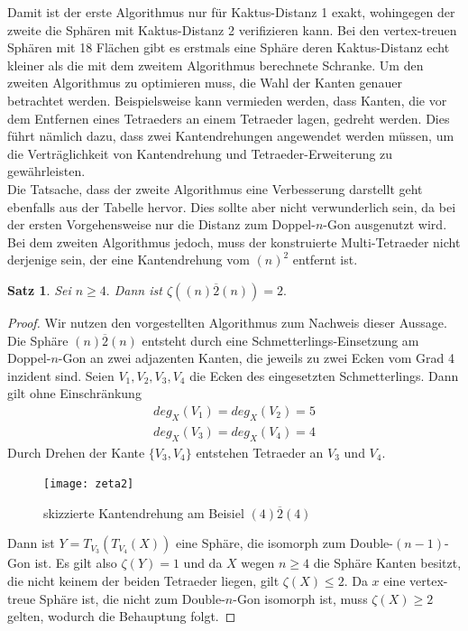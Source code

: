 \documentclass[12pt,titlepage,twoside,cleardoublepage]{article}
\theoremstyle{nummermitklammern}
\newtheorem{satz}[temp]{Satz}
\newtheorem{satz}[zahl]{Satz}
\numberwithin{equation}{section}
\begin{document}
Damit ist der erste Algorithmus nur für Kaktus-Distanz 1 exakt, wohingegen der zweite die Sphären mit Kaktus-Distanz 2 verifizieren kann. Bei den vertex-treuen Sphären mit 18 Flächen gibt es erstmals eine Sphäre deren Kaktus-Distanz echt kleiner als die mit dem zweitem Algorithmus berechnete Schranke.
Um den zweiten Algorithmus zu optimieren muss, die Wahl der Kanten genauer betrachtet werden. Beispielsweise kann vermieden werden, dass Kanten, die vor dem Entfernen eines Tetraeders an einem Tetraeder lagen, gedreht werden. Dies führt nämlich dazu, dass zwei Kantendrehungen angewendet werden müssen, um die Verträglichkeit von Kantendrehung und Tetraeder-Erweiterung zu gewährleisten.\\
Die Tatsache, dass der zweite Algorithmus eine Verbesserung darstellt geht ebenfalls aus der Tabelle hervor. Dies sollte aber nicht verwunderlich sein, da bei der ersten Vorgehensweise nur die Distanz zum Doppel-$n$-Gon  ausgenutzt wird. Bei dem zweiten Algorithmus jedoch, muss der konstruierte Multi-Tetraeder nicht derjenige sein, der eine Kantendrehung vom $(n)^2$ entfernt ist.
\begin{satz}
Sei $n \geq 4.$ Dann ist $\zeta((n)\overline{2}(n))=2.$
\end{satz}
\begin{proof}
Wir nutzen den vorgestellten Algorithmus zum Nachweis dieser Aussage.
Die Sphäre $(n)\overline{2}(n)$ entsteht durch eine Schmetterlings-Einsetzung am Doppel-$n$-Gon an zwei adjazenten Kanten, die jeweils zu zwei Ecken vom Grad 4 inzident sind. Seien $V_1,V_2,V_3,V_4$ die Ecken des eingesetzten Schmetterlings. Dann gilt ohne Einschränkung 
\begin{align*}
deg_X(V_1)=deg_X(V_2)=5\\
deg_X(V_3)=deg_X(V_4)=4
\end{align*}
Durch Drehen der Kante $\{V_3,V_4\}$ entstehen Tetraeder an $V_3$ und $V_4.$ 
  
\begin{figure}[H]
\begin{center}
\texttt{[image: zeta2]}
\end{center}
\caption{skizzierte Kantendrehung am Beisiel $(4)\overline{2}(4)$}
\end{figure}
Dann ist $Y=T_{V_3}(T_{V_4}(X))$ eine Sphäre, die isomorph zum Double-$(n-1)$-Gon ist. Es gilt also $\zeta (Y)=1$ und da $X$ wegen $n\geq 4$ die Sphäre Kanten besitzt, die nicht keinem der beiden Tetraeder liegen, gilt $\zeta (X)\leq 2.$ Da $x$ eine vertex-treue Sphäre ist, die nicht zum Double-$n$-Gon isomorph ist, muss $\zeta(X)\geq 2$ gelten, wodurch die Behauptung folgt. 
\end{proof}
\end{document}
